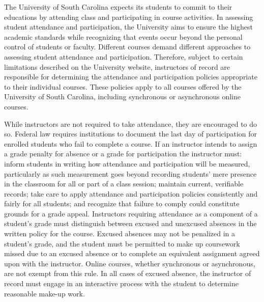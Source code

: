 \documentclass[11pt,letterpaper]{article}
\begin{document}

The University of South Carolina expects its students to commit to their educations by attending class and participating in course activities. In assessing student attendance and participation, the University aims to ensure the highest academic standards while recognizing that events occur beyond the personal control of students or faculty. Different courses demand different approaches to assessing student attendance and participation. Therefore, subject to certain limitations described on the University website, instructors of record are responsible for determining the attendance and participation policies appropriate to their individual courses. These policies apply to all courses offered by the University of South Carolina, including synchronous or asynchronous online courses. \pspace

While instructors are not required to take attendance, they are encouraged to do so. Federal law requires institutions to document the last day of participation for enrolled students who fail to complete a course. If an instructor intends to assign a grade penalty for absence or a grade for participation the instructor must: inform students in writing how attendance and participation will be measured, particularly as such measurement goes beyond recording students' mere presence in the classroom for all or part of a class session; maintain current, verifiable records; take care to apply attendance and participation policies consistently and fairly for all students; and recognize that failure to comply could constitute grounds for a grade appeal. Instructors requiring attendance as a component of a student’s grade must distinguish between excused and unexcused absences in the written policy for the course. Excused absences may not be penalized in a student’s grade, and the student must be permitted to make up coursework missed due to an excused absence or to complete an equivalent assignment agreed upon with the instructor. Online courses, whether synchronous or asynchronous, are not exempt from this rule. In all cases of excused absence, the instructor of record must engage in an interactive process with the student to determine reasonable make-up work. \pspace
\end{document}
